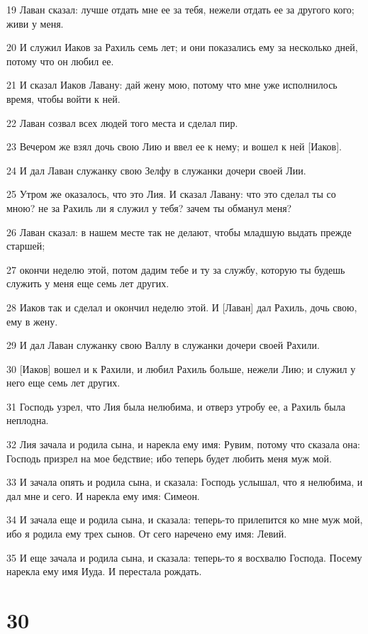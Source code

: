 \par 19 Лаван сказал: лучше отдать мне ее за тебя, нежели отдать ее за другого кого; живи у меня.
\par 20 И служил Иаков за Рахиль семь лет; и они показались ему за несколько дней, потому что он любил ее.
\par 21 И сказал Иаков Лавану: дай жену мою, потому что мне уже исполнилось время, чтобы войти к ней.
\par 22 Лаван созвал всех людей того места и сделал пир.
\par 23 Вечером же взял дочь свою Лию и ввел ее к нему; и вошел к ней [Иаков].
\par 24 И дал Лаван служанку свою Зелфу в служанки дочери своей Лии.
\par 25 Утром же оказалось, что это Лия. И сказал Лавану: что это сделал ты со мною? не за Рахиль ли я служил у тебя? зачем ты обманул меня?
\par 26 Лаван сказал: в нашем месте так не делают, чтобы младшую выдать прежде старшей;
\par 27 окончи неделю этой, потом дадим тебе и ту за службу, которую ты будешь служить у меня еще семь лет других.
\par 28 Иаков так и сделал и окончил неделю этой. И [Лаван] дал Рахиль, дочь свою, ему в жену.
\par 29 И дал Лаван служанку свою Валлу в служанки дочери своей Рахили.
\par 30 [Иаков] вошел и к Рахили, и любил Рахиль больше, нежели Лию; и служил у него еще семь лет других.
\par 31 Господь узрел, что Лия была нелюбима, и отверз утробу ее, а Рахиль была неплодна.
\par 32 Лия зачала и родила сына, и нарекла ему имя: Рувим, потому что сказала она: Господь призрел на мое бедствие; ибо теперь будет любить меня муж мой.
\par 33 И зачала опять и родила сына, и сказала: Господь услышал, что я нелюбима, и дал мне и сего. И нарекла ему имя: Симеон.
\par 34 И зачала еще и родила сына, и сказала: теперь-то прилепится ко мне муж мой, ибо я родила ему трех сынов. От сего наречено ему имя: Левий.
\par 35 И еще зачала и родила сына, и сказала: теперь-то я восхвалю Господа. Посему нарекла ему имя Иуда. И перестала рождать.

\chapter{30}

